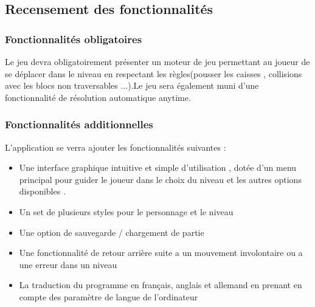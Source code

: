 \documentclass{article}
\begin{document}
		\subsection{Recensement des fonctionnalités}
		\vspace{1cm}
			\subsubsection{Fonctionnalités obligatoires}
			Le jeu devra obligatoirement présenter un moteur de jeu permettant au joueur de se déplacer dans le niveau en respectant les règles(pousser les caisses , collisions avec les blocs non traversables ...).Le jeu sera également muni d'une fonctionnalité de résolution automatique anytime.
			\subsubsection{Fonctionnalités additionnelles}
			L'application se verra ajouter les fonctionnalités suivantes :
			\begin{itemize}
			\item Une interface graphique intuitive et simple d'utilisation , dotée d'un menu principal pour guider le joueur dans le choix du niveau et les autres options disponibles .
			\item Un set de plusieurs styles pour le personnage et le niveau 
			\item Une option de sauvegarde / chargement de partie
			\item Une fonctionnalité de retour arrière suite a un mouvement involontaire ou a une erreur dans un niveau
			\item La traduction du programme en français, anglais et allemand en prenant en compte des paramètre de langue de l'ordinateur
			\end{itemize}
\end{document}
